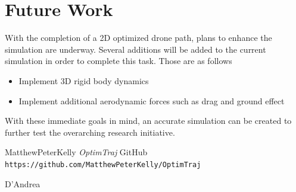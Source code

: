 \documentclass[12pt]{article}
\begin{document}
\section{Future Work}
With the completion of a 2D optimized drone path, plans to enhance the simulation are underway. Several additions will be added to the current simulation in order to complete this task. Those are as follows 
\newline
\begin{itemize}
  \item Implement 3D rigid body dynamics
  \item Implement additional aerodynamic forces such as drag and ground effect
\end{itemize}
With these immediate goals in mind, an accurate simulation can be created to further test the overarching research initiative.
\clearpage
\begin{thebibliography}{9}
MatthewPeterKelly
\textit{OptimTraj}
GitHub
\\\texttt{https://github.com/MatthewPeterKelly/OptimTraj}

D'Andrea

\end{thebibliography}

\end{document}
